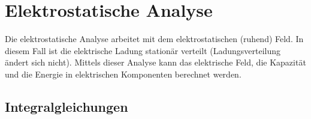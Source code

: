 \section{Elektrostatische Analyse}
Die elektrostatische Analyse arbeitet mit dem elektrostatischen (ruhend) Feld. In diesem Fall ist die elektrische Ladung stationär verteilt (Ladungsverteilung ändert sich nicht). Mittels dieser Analyse kann das elektrische Feld, die Kapazität und die Energie in elektrischen Komponenten berechnet werden.
\subsection{Integralgleichungen}
\begin{longtable}{|p{} |p{}|p{}|}
	\hline
\end{longtable}



